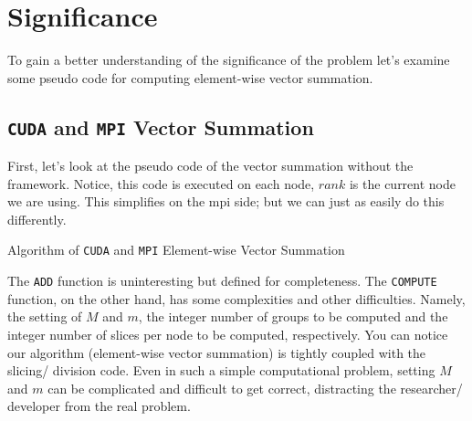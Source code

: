 \section{Significance}

To gain a better understanding of the significance of the problem let's examine
some pseudo code for computing element-wise vector summation.

\subsection{\texttt{CUDA} and \texttt{MPI} Vector Summation}

First, let's look at the pseudo code of the vector summation without the
framework. Notice, this code is executed on each node, $rank$ is the current
node we are using. This simplifies  on the \gls{mpi} side; but we can just as
easily do this differently.

\begin{algorithm}
\begin{algorithmic}
\EndFunction{}
    \EndFor{}
\EndFunction{}
\end{algorithmic}
\caption{Algorithm of \texttt{CUDA} and \texttt{MPI} Element-wise Vector
Summation}
\label{alg:cuda_mpi_vsum}
\end{algorithm}

The \texttt{ADD} function is uninteresting but defined for completeness. The
\texttt{COMPUTE} function, on the other hand, has some complexities and other
difficulties. Namely, the setting of $M$ and $m$, the integer number of groups
to be computed and the integer number of slices per node to be computed,
respectively. You can notice our algorithm (element-wise vector summation) is
tightly coupled with the slicing/ division code. Even in such a simple
computational problem, setting $M$ and $m$ can be complicated and difficult to
get correct, distracting the researcher/ developer from the real problem.

